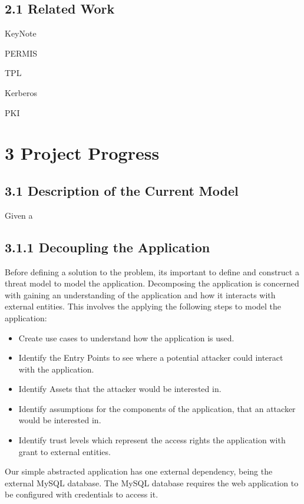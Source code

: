 \documentclass[11pt, a4paper, twoside, openright]{report}
\begin{document}
\subsection*{2.1 Related Work}

KeyNote

PERMIS

TPL

Kerberos

PKI


\section*{3 Project Progress}
\subsection*{3.1 Description of the Current Model}
Given a 



\subsection*{3.1.1 Decoupling the Application}
Before defining a solution to the problem, its important to define and construct a threat model to model the application. Decomposing the application is concerned with gaining an understanding of the application and how it interacts with external entities. This involves the applying the following steps to model the application:  

\begin{itemize}
  \item Create use cases to understand how the application is used.
  \item Identify the Entry Points to see where a potential attacker could interact with the application.
  \item Identify Assets that the attacker would be interested in.
  \item Identify assumptions for the components of the application, that an attacker would be interested in.
  \item Identify trust levels which represent the access rights the application with grant to external entities. 
\end{itemize}

Our simple abstracted application has one external dependency, being the external MySQL database.  The MySQL database requires the web application to be configured with credentials to access it. 
\end{document}
